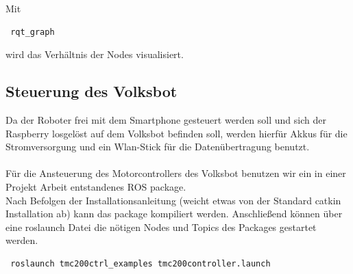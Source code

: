 \documentclass[12pt]{article}
\begin{document}
Mit 

 \begin{lstlisting}
 rqt_graph 
 \end{lstlisting}

wird das Verhältnis der Nodes visualisiert.





	

\subsection{Steuerung des Volksbot}

Da der Roboter frei mit dem Smartphone gesteuert werden soll und sich der Raspberry losgelöst auf dem Volksbot befinden soll, werden hierfür Akkus für die Stromversorgung und ein Wlan-Stick für die Datenübertragung benutzt. \\
\\
Für die Ansteuerung des Motorcontrollers des Volksbot benutzen wir ein in einer Projekt Arbeit entstandenes ROS package. \cite{Motorsteuerung} \\
Nach Befolgen der Installationsanleitung (weicht etwas von der Standard catkin Installation ab) kann das package kompiliert werden.
Anschließend können über eine roslaunch Datei die nötigen Nodes und Topics des Packages gestartet werden.

 \begin{lstlisting}
 roslaunch tmc200ctrl_examples tmc200controller.launch
 \end{lstlisting}
 
\end{document}
